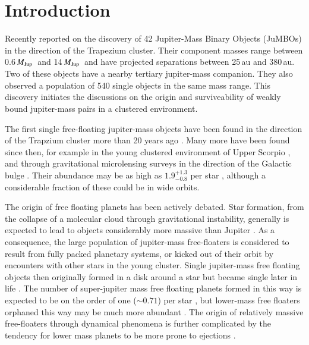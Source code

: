 \documentclass[aa]{lib/aa}
\newcommand{\MJup}{\mbox{${M}_{\rm Jup}$}}
\newcommand{\jumbos}{\mbox{JuMBOs}}
\begin{document}
   \maketitle
   
\section{Introduction}

Recently \cite{2023arXiv231001231P} reported on the discovery of 42
Jupiter-Mass Binary Objects (\jumbos) in the direction of the
Trapezium cluster.  Their component masses range between 0.6\,\MJup\,
and 14\,\MJup\, and have projected separations between 25\,au and
380\,au.  Two of these objects have a nearby tertiary jupiter-mass
companion.  They also observed a population of 540 single objects in
the same mass range. This discovery initiates the discussions on the
origin and surviveability of weakly bound jupiter-mass pairs in a
clustered environment.

The first single free-floating jupiter-mass objects have been found in
the direction of the Trapzium cluster more than 20 years ago
\citep{2000Sci...290..103Z,2000MNRAS.314..858L,2000AGM....17..A11M}.
Many more have been found since then, for example in the young
clustered environment of Upper Scorpio \citep{2022NatAs...6...89M}, and
through gravitational microlensing surveys in the direction of the
Galactic bulge \citep{2011Natur.473..349S}.  Their abundance may be as
high as $1.9^{+1.3}_{-0.8}$ per star \citep{2011Natur.473..349S},
although a considerable fraction of these could be in wide orbits.

The origin of free floating planets has been actively debated. Star
formation, from the collapse of a molecular cloud through
gravitational instability, generally is expected to lead to objects
considerably more massive than Jupiter
\citep{1976MNRAS.176..367L,2005A&A...430.1059B}.  As a consequence,
the large population of jupiter-mass free-floaters is considered to
result from fully packed planetary systems, or kicked out of their
orbit by encounters with other stars in the young cluster. Single
jupiter-mass free floating objects then originally formed in a disk
around a star but became single later in life
\citep{1996Sci...274..954R,2015MNRAS.453.2759Z,2002ApJ...565.1251H,2017MNRAS.470.4337C,
  2019MNRAS.489.2280F, 2019A&A...624A.120V}.  The number of
super-jupiter mass free floating planets formed in this way is
expected to be on the order of one ($\sim 0.71$) per star
\citep{2019A&A...624A.120V}, but lower-mass free floaters orphaned
this way may be much more abundant \citep{2002ApJ...565.1251H}.  The
origin of relatively massive free-floaters through dynamical phenomena
is further complicated by the tendency for lower mass planets to be
more prone to ejections
\citep{2001Icar..150..303F,2013MNRAS.433..867H,2019MNRAS.489.2280F,2020MNRAS.497.1807S}.
\end{document}
